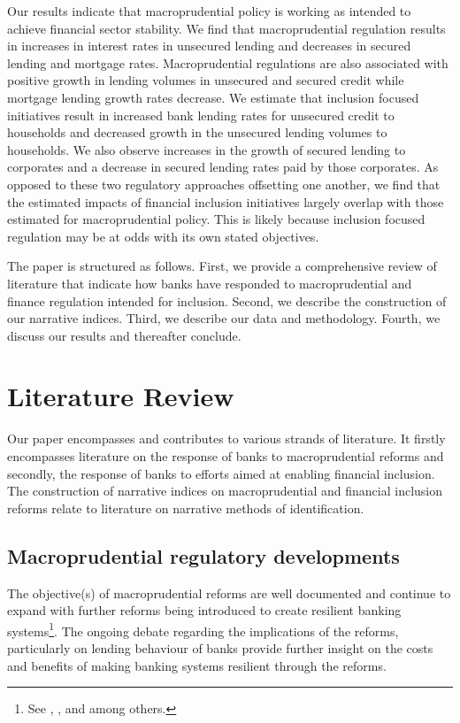 \documentclass[
  letterpaper,
  DIV=11,
  numbers=noendperiod]{scrartcl}
\begin{document}
Our results indicate that macroprudential policy is working as intended
to achieve financial sector stability. We find that macroprudential
regulation results in increases in interest rates in unsecured lending
and decreases in secured lending and mortgage rates. Macroprudential
regulations are also associated with positive growth in lending volumes
in unsecured and secured credit while mortgage lending growth rates
decrease. We estimate that inclusion focused initiatives result in
increased bank lending rates for unsecured credit to households and
decreased growth in the unsecured lending volumes to households. We also
observe increases in the growth of secured lending to corporates and a
decrease in secured lending rates paid by those corporates. As opposed
to these two regulatory approaches offsetting one another, we find that
the estimated impacts of financial inclusion initiatives largely overlap
with those estimated for macroprudential policy. This is likely because
inclusion focused regulation may be at odds with its own stated
objectives.

The paper is structured as follows. First, we provide a comprehensive
review of literature that indicate how banks have responded to
macroprudential and finance regulation intended for inclusion. Second,
we describe the construction of our narrative indices. Third, we
describe our data and methodology. Fourth, we discuss our results and
thereafter conclude.

\section{Literature Review}\label{literature-review}

Our paper encompasses and contributes to various strands of literature.
It firstly encompasses literature on the response of banks to
macroprudential reforms and secondly, the response of banks to efforts
aimed at enabling financial inclusion. The construction of narrative
indices on macroprudential and financial inclusion reforms relate to
literature on narrative methods of identification.

\subsection{Macroprudential regulatory
developments}\label{macroprudential-regulatory-developments}

The objective(s) of macroprudential reforms are well documented and
continue to expand with further reforms being introduced to create
resilient banking
systems\footnote{See \cite{kashyap2004cyclical}, \cite{basel06}, \cite{cohen2016banks} and \cite{cerutti2018changes} among others.}.
The ongoing debate regarding the implications of the reforms,
particularly on lending behaviour of banks provide further insight on
the costs and benefits of making banking systems resilient through the
reforms.
\end{document}

